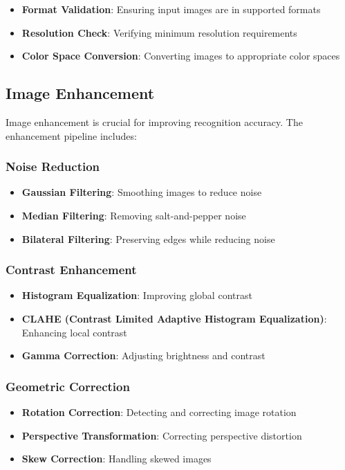 \begin{itemize}
\item \textbf{Format Validation}: Ensuring input images are in supported formats
\item \textbf{Resolution Check}: Verifying minimum resolution requirements
\item \textbf{Color Space Conversion}: Converting images to appropriate color spaces
\end{itemize}

\subsection{Image Enhancement}

Image enhancement is crucial for improving recognition accuracy. The enhancement pipeline includes:

\subsubsection{Noise Reduction}
\begin{itemize}
\item \textbf{Gaussian Filtering}: Smoothing images to reduce noise
\item \textbf{Median Filtering}: Removing salt-and-pepper noise
\item \textbf{Bilateral Filtering}: Preserving edges while reducing noise
\end{itemize}

\subsubsection{Contrast Enhancement}
\begin{itemize}
\item \textbf{Histogram Equalization}: Improving global contrast
\item \textbf{CLAHE (Contrast Limited Adaptive Histogram Equalization)}: Enhancing local contrast
\item \textbf{Gamma Correction}: Adjusting brightness and contrast
\end{itemize}

\subsubsection{Geometric Correction}
\begin{itemize}
\item \textbf{Rotation Correction}: Detecting and correcting image rotation
\item \textbf{Perspective Transformation}: Correcting perspective distortion
\item \textbf{Skew Correction}: Handling skewed images
\end{itemize}

